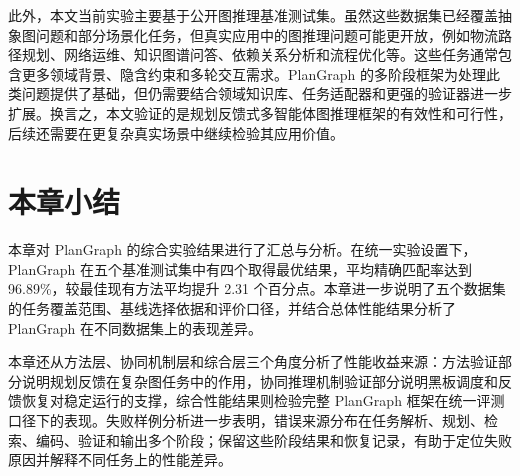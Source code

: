 此外，本文当前实验主要基于公开图推理基准测试集。虽然这些数据集已经覆盖抽象图问题和部分场景化任务，但真实应用中的图推理问题可能更开放，例如物流路径规划、网络运维、知识图谱问答、依赖关系分析和流程优化等。这些任务通常包含更多领域背景、隐含约束和多轮交互需求。PlanGraph 的多阶段框架为处理此类问题提供了基础，但仍需要结合领域知识库、任务适配器和更强的验证器进一步扩展。换言之，本文验证的是规划反馈式多智能体图推理框架的有效性和可行性，后续还需要在更复杂真实场景中继续检验其应用价值。

\section{本章小结}

本章对 PlanGraph 的综合实验结果进行了汇总与分析。在统一实验设置下，PlanGraph 在五个基准测试集中有四个取得最优结果，平均精确匹配率达到 96.89\%，较最佳现有方法平均提升 2.31 个百分点。本章进一步说明了五个数据集的任务覆盖范围、基线选择依据和评价口径，并结合总体性能结果分析了 PlanGraph 在不同数据集上的表现差异。

本章还从方法层、协同机制层和综合层三个角度分析了性能收益来源：方法验证部分说明规划反馈在复杂图任务中的作用，协同推理机制验证部分说明黑板调度和反馈恢复对稳定运行的支撑，综合性能结果则检验完整 PlanGraph 框架在统一评测口径下的表现。失败样例分析进一步表明，错误来源分布在任务解析、规划、检索、编码、验证和输出多个阶段；保留这些阶段结果和恢复记录，有助于定位失败原因并解释不同任务上的性能差异。
